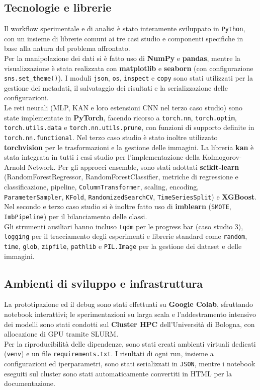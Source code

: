 \documentclass[a4paper,12pt]{report}
\begin{document}
	\subsection{Tecnologie e librerie}
	Il workflow sperimentale e di analisi è stato interamente sviluppato in \texttt{Python}, con un insieme di librerie comuni ai tre casi studio e componenti specifiche in base alla natura del problema affrontato. \\
	Per la manipolazione dei dati si è fatto uso di \textbf{NumPy} e \textbf{pandas}, mentre la visualizzazione è stata realizzata con \textbf{matplotlib} e \textbf{seaborn} (con configurazione \texttt{sns.set\_theme()}). I moduli \texttt{json}, \texttt{os}, \texttt{inspect} e \texttt{copy} sono stati utilizzati per la gestione dei metadati, il salvataggio dei risultati e la serializzazione delle configurazioni. \\
	Le reti neurali (MLP, KAN e loro estensioni CNN nel terzo caso studio) sono state implementate in \textbf{PyTorch}, facendo ricorso a \texttt{torch.nn}, \texttt{torch.optim}, \texttt{torch.utils.data} e \texttt{torch.nn.utils.prune}, con funzioni di supporto definite in \texttt{torch.nn.functional}. Nel terzo caso studio è stato inoltre utilizzato \textbf{torchvision} per le trasformazioni e la gestione delle immagini. La libreria \textbf{kan} è stata integrata in tutti i casi studio per l’implementazione della Kolmogorov-Arnold Network.
	Per gli approcci ensemble, sono stati adottati \textbf{scikit-learn} (RandomForestRegressor, RandomForestClassifier, metriche di regressione e classificazione, pipeline, \texttt{ColumnTransformer}, scaling, encoding, \texttt{ParameterSampler}, \texttt{KFold}, \texttt{RandomizedSearchCV}, \texttt{TimeSeriesSplit}) e \textbf{XGBoost}. Nel secondo e terzo caso studio si è inoltre fatto uso di \textbf{imblearn} (\texttt{SMOTE}, \texttt{ImbPipeline}) per il bilanciamento delle classi. \\
	Gli strumenti ausiliari hanno incluso \texttt{tqdm} per le progress bar (caso studio 3), \texttt{logging} per il tracciamento degli esperimenti e librerie standard come \texttt{random}, \texttt{time}, \texttt{glob}, \texttt{zipfile}, \texttt{pathlib} e \texttt{PIL.Image} per la gestione dei dataset e delle immagini.
	
	\subsection{Ambienti di sviluppo e infrastruttura}
	La prototipazione ed il debug sono stati effettuati su \textbf{Google Colab}, sfruttando notebook interattivi; le sperimentazioni su larga scala e l’addestramento intensivo dei modelli sono stati condotti sul \textbf{Cluster HPC} dell’Università di Bologna, con allocazione di GPU tramite SLURM. \\
	Per la riproducibilità delle dipendenze, sono stati creati ambienti virtuali dedicati (\texttt{venv}) e un file \texttt{requirements.txt}. I risultati di ogni run, insieme a configurazioni ed iperparametri, sono stati serializzati in \texttt{JSON}, mentre i notebook eseguiti sul cluster sono stati automaticamente convertiti in HTML per la documentazione.
	
\end{document}
